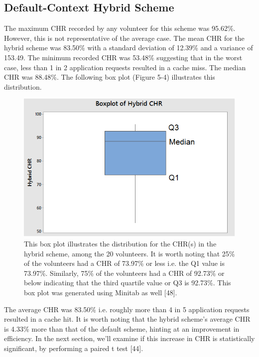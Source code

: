 \documentclass[12pt]{uthesis-v12}  %
\begin{document}
			\subsection{Default-Context Hybrid Scheme}
				The maximum CHR recorded by any volunteer for this scheme was 95.62\%. However, this is not representative of the average case. The mean CHR for the hybrid scheme was 83.50\% with a standard deviation of 12.39\% and a variance of 153.49. The minimum recorded CHR was 53.48\% suggesting that in the worst case, less than 1 in 2 application requests resulted in a cache miss. The median CHR was 88.48\%. The following box plot (Figure 5-4) illustrates this distribution.
				
				\begin{figure}[h]
					\centering
					\includegraphics[width = 130mm]{images/hybridScheme.png}
					\caption[Distribution of CHR for Hybrid Scheme]{This box plot illustrates the distribution for the CHR(s) in the hybrid scheme, among the 20 volunteers. It is worth noting that 25\% of the volunteers had a CHR of 73.97\% or less i.e. the Q1 value is 73.97\%. Similarly, 75\% of the volunteers had a CHR of 92.73\% or below indicating that the third quartile value or Q3 is 92.73\%. This box plot was generated using Minitab as well [48].}
				\end{figure}
				
				The average CHR was 83.50\% i.e. roughly more than 4 in 5 application requests resulted in a cache hit. It is worth noting that the hybrid scheme's average CHR is 4.33\% more than that of the default scheme, hinting at an improvement in efficiency. In the next section, we'll examine if this increase in CHR is statistically significant, by performing a paired t test [44]. 
\end{document}

